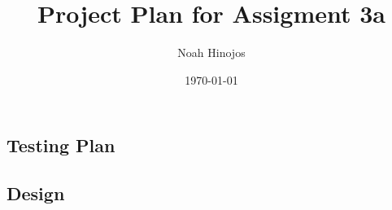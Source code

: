 \documentclass[12pt]{article}
\title{\textbf{Project Plan for Assigment 3a}}
\author{Noah Hinojos}
\date{\today}
\begin{document}
\maketitle

\subsection*{Testing Plan}

\subsection*{Design}
\end{document}
